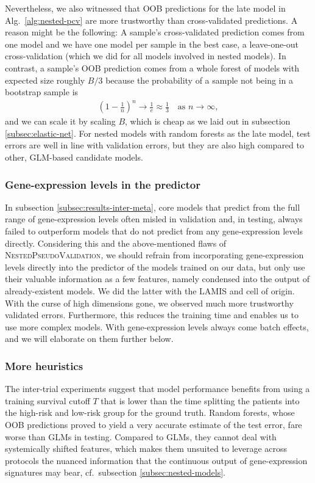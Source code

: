 Nevertheless, we also witnessed that OOB predictions for the late model in Alg.\ 
\ref{alg:nested-pcv} are more trustworthy than cross-validated predictions. A reason might be the 
following: A sample's cross-validated prediction comes 
from one model and we have one model per sample in the best case, a leave-one-out cross-validation 
(which we did for all models involved in nested models). In contrast, a sample's OOB prediction 
comes from a whole forest of models with expected size roughly $B/3$ because the probability of a 
sample not being in a bootstrap sample is
\begin{align}
    \left( 1 - \frac{1}{n} \right)^n \to \frac{1}{e} \approx \frac{1}{3} \quad \text{as } n \to 
    \infty,
\end{align}
and we can scale it by scaling $B$, which is cheap as we laid out in subsection 
\ref{subsec:elastic-net}. For nested models with random forests as the late model, test errors 
are well in line with validation errors, but they are also high compared to other, GLM-based 
candidate models.

\subsubsection{Gene-expression levels in the predictor}

In subsection \ref{subsec:results-inter-meta}, core models that predict from the full range
of gene-expression levels often misled in validation and, in testing, always failed to outperform 
models that do not predict from any gene-expression levels directly.
Considering this and the above-mentioned flaws of \textsc{NestedPseudoValidation}, we should refrain from 
incorporating gene-expression levels directly into the predictor of the models 
trained on our data, but only use their valuable information as a few features, namely condensed 
into the output of already-existent models. We did the latter with the LAMIS and cell of origin. 
With the curse of high dimensions gone, we observed much more 
trustworthy validated errors. Furthermore, this reduces the training time and enables us to use 
more complex models. With gene-expression levels 
always come batch effects, and we will elaborate on them further below.

\subsubsection{More heuristics}

The inter-trial experiments suggest that model performance benefits from using a training 
survival cutoff $T$ that is lower than the time splitting the patients into the high-risk and 
low-risk group for the ground truth. Random forests, whose OOB predictions proved to yield a very 
accurate estimate of the test error, fare worse than GLMs in testing. Compared to GLMs, they 
cannot deal with systemically shifted features, which makes them unsuited to leverage across 
protocols the nuanced information that the continuous output of gene-expression signatures 
may bear, cf.\ subsection \ref{subsec:nested-models}.

